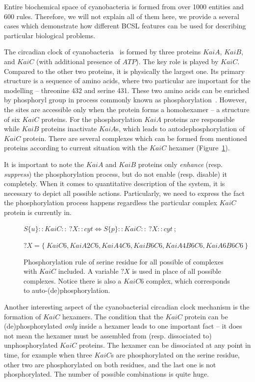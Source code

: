 \documentclass[12pt, twoside]{fithesis2} %
\begin{document}
Entire biochemical space of cyanobacteria is formed from over 1000 entities and 600 rules. Therefore, we will not explain all of them here, we provide a several cases which demonstrate how different BCSL features can be used for describing particular biological problems.

The circadian clock of cyanobacteria~\cite{CCR} is formed by three proteins $KaiA$, $KaiB$, and $KaiC$ (with additional presence of $ATP$). The key role is played by $KaiC$. Compared to the other two proteins, it is physically the largest one. Its primary structure is a sequence of amino acids, where two particular are important for the modelling -- threonine 432 and serine 431. These two amino acids can be enriched by phosphoryl group in process commonly known as phosphorylation~\cite{cohen2002origins}. However, the sites are accessible only when the protein forms a homohexamer -- a structure of six $KaiC$ proteins. For the phosphorylation $KaiA$ proteins are responsible while $KaiB$ proteins inactivate $KaiA$s, which leads to autodephosphorylation of $KaiC$ protein. There are several complexes which can be formed from mentioned proteins according to current situation with the $KaiC$ hexamer (Figure~\ref{phospho_rule}).

It is important to note the $KaiA$ and $KaiB$ proteins only \emph{enhance} (resp. \emph{suppress}) the phosphorylation process, but do not enable (resp. disable) it completely. When it comes to quantitative description of the system, it is necessary to depict all possible actions. Particularly, we need to express the fact the phosphorylation process happens regardless the particular complex $KaiC$ protein is currently in. 

\begin{figure}[!h]
{\small
\begin{center}
$ S\{u\}::KaiC::~?X::cyt \Leftrightarrow S\{p\}::KaiC::~?X::cyt ~;~$

$ ?X = \{~KaiC6, KaiA2C6, KaiA4C6, KaiB6C6, KaiA4B6C6, KaiA6B6C6~\} $
\end{center}
}
\caption{Phosphorylation rule of serine residue for all possible of complexes with $KaiC$ included. A variable $?X$ is used in place of all possible complexes. Notice there is also a $KaiC6$ complex, which corresponds to auto-(de)phosphorylation.}\label{phospho_rule}
\end{figure}

Another interesting aspect of the cyanobacterial circadian clock mechanism is the formation of $KaiC$ hexamers. The condition that the $KaiC$ protein can be (de)phosphorylated \emph{only} inside a hexamer leads to one important fact -- it does not mean the hexamer must be assembled from (resp. dissociated to) unphosphorylated $KaiC$ proteins. The hexamer can be dissociated at any point in time, for example when three $KaiC$s are phosphorylated on the serine residue, other two are phosphorylated on both residues, and the last one is not phosphorylated. The number of possible combinations is quite huge.
\end{document}
